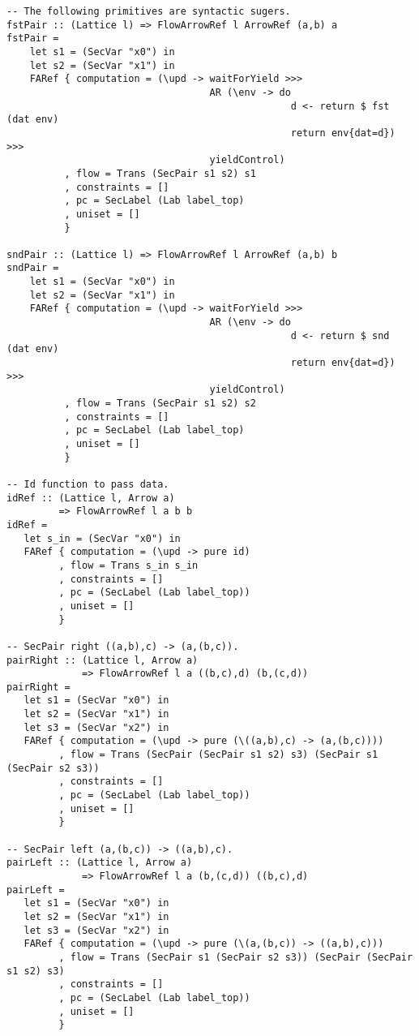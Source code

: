 \begin{Verbatim}[fontsize=\footnotesize,frame=lines,
                 framesep=5mm, label={[FlowArrowRef.hs]FlowArrowRef.hs}]
-- The following primitives are syntactic sugers.
fstPair :: (Lattice l) => FlowArrowRef l ArrowRef (a,b) a
fstPair =
    let s1 = (SecVar "x0") in
    let s2 = (SecVar "x1") in
    FARef { computation = (\upd -> waitForYield >>>
                                   AR (\env -> do 
                                                 d <- return $ fst (dat env)
                                                 return env{dat=d}) >>>
                                   yieldControl)
          , flow = Trans (SecPair s1 s2) s1
          , constraints = []
          , pc = SecLabel (Lab label_top)
          , uniset = []
          }

sndPair :: (Lattice l) => FlowArrowRef l ArrowRef (a,b) b
sndPair =
    let s1 = (SecVar "x0") in
    let s2 = (SecVar "x1") in
    FARef { computation = (\upd -> waitForYield >>>
                                   AR (\env -> do
                                                 d <- return $ snd (dat env)
                                                 return env{dat=d}) >>>
                                   yieldControl)
          , flow = Trans (SecPair s1 s2) s2
          , constraints = []
          , pc = SecLabel (Lab label_top)
          , uniset = []
          }

-- Id function to pass data.
idRef :: (Lattice l, Arrow a) 
         => FlowArrowRef l a b b
idRef =
   let s_in = (SecVar "x0") in
   FARef { computation = (\upd -> pure id)
         , flow = Trans s_in s_in
         , constraints = []
         , pc = (SecLabel (Lab label_top))
         , uniset = []
         }

-- SecPair right ((a,b),c) -> (a,(b,c)).
pairRight :: (Lattice l, Arrow a) 
             => FlowArrowRef l a ((b,c),d) (b,(c,d))
pairRight =
   let s1 = (SecVar "x0") in
   let s2 = (SecVar "x1") in
   let s3 = (SecVar "x2") in
   FARef { computation = (\upd -> pure (\((a,b),c) -> (a,(b,c))))
         , flow = Trans (SecPair (SecPair s1 s2) s3) (SecPair s1 (SecPair s2 s3))
         , constraints = []
         , pc = (SecLabel (Lab label_top))
         , uniset = []
         }

-- SecPair left (a,(b,c)) -> ((a,b),c).
pairLeft :: (Lattice l, Arrow a) 
             => FlowArrowRef l a (b,(c,d)) ((b,c),d)
pairLeft =
   let s1 = (SecVar "x0") in
   let s2 = (SecVar "x1") in
   let s3 = (SecVar "x2") in
   FARef { computation = (\upd -> pure (\(a,(b,c)) -> ((a,b),c)))
         , flow = Trans (SecPair s1 (SecPair s2 s3)) (SecPair (SecPair s1 s2) s3)
         , constraints = []
         , pc = (SecLabel (Lab label_top))
         , uniset = []
         }


\end{Verbatim}
